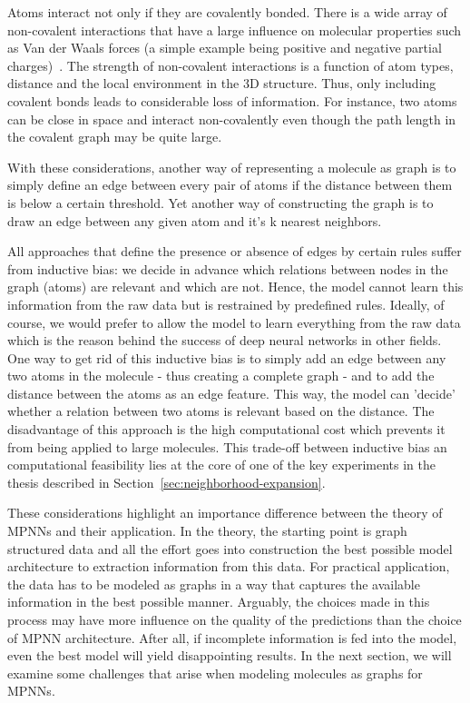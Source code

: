 Atoms interact not only if they are covalently bonded. There is a wide array of non-covalent interactions that have a large influence on molecular properties such as Van der Waals forces (a simple example being positive and negative partial charges)~\cite{Organic-chemistry}. The strength of non-covalent interactions is a function of atom types, distance and the local environment in the 3D structure. Thus, only including covalent bonds leads to considerable loss of information. For instance, two atoms can be close in space and interact non-covalently even though the path length in the covalent graph may be quite large.

With these considerations, another way of representing a molecule as graph is to simply define an edge between every pair of atoms if the distance between them is below a certain threshold. Yet another way of constructing the graph is to draw an edge between any given atom and it's k nearest neighbors.

All approaches that define the presence or absence of edges by certain rules suffer from inductive bias: we decide in advance which relations between nodes in the graph (atoms) are relevant and which are not. Hence, the model cannot learn this information from the raw data but is restrained by predefined rules. Ideally, of course, we would prefer to allow the model to learn everything from the raw data which is the reason behind the success of deep neural networks in other fields. One way to get rid of this inductive bias is to simply add an edge between any two atoms in the molecule - thus creating a complete graph - and to add the distance between the atoms as an edge feature. This way, the model can 'decide' whether a relation between two atoms is relevant based on the distance. The disadvantage of this approach is the high computational cost which prevents it from being applied to large molecules. This trade-off between inductive bias an computational feasibility lies at the core of one of the key experiments in the thesis described in Section~\ref{sec:neighborhood-expansion}.

%

These considerations highlight an importance difference between the theory of MPNNs and their application. In the theory, the starting point is graph structured data and all the effort goes into construction the best possible model architecture to extraction information from this data. For practical application, the data has to be modeled as graphs in a way that captures the available information in the best possible manner. Arguably, the choices made in this process may have more influence on the quality of the predictions than the choice of MPNN architecture. After all, if incomplete information is fed into the model, even the best model will yield disappointing results. In the next section, we will examine some challenges that arise when modeling molecules as graphs for MPNNs.


